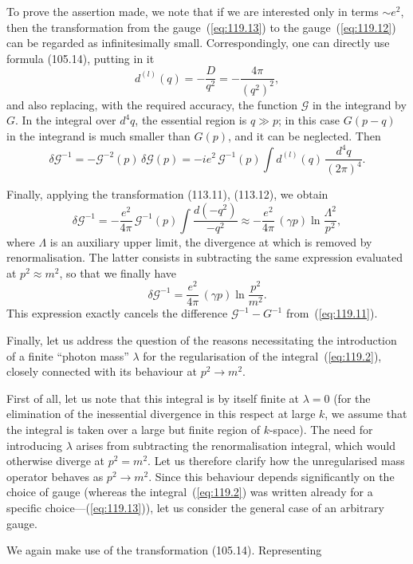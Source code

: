 
To prove the assertion made, we note that if we are interested only in terms $\sim e^2$, then the transformation from the gauge~(\ref{eq:119.13}) to the gauge~(\ref{eq:119.12}) can be regarded as infinitesimally small. Correspondingly, one can directly use formula (105.14), putting in it
\[
d^{(l)}(q) = -\frac{D}{q^2} = -\frac{4\pi}{(q^2)^2},
\]
and also replacing, with the required accuracy, the function $\mathcal{G}$ in the integrand by $G$. In the integral over $d^4q$, the essential region is $q \gg p$; in this case $G(p-q)$ in the integrand is much smaller than $G(p)$, and it can be neglected. Then
\[
\delta\mathcal{G}^{-1} = -\mathcal{G}^{-2}(p)\,\delta\mathcal{G}(p) = -ie^2\,\mathcal{G}^{-1}(p) \int d^{(l)}(q)\,\frac{d^4q}{(2\pi)^4}.
\]

Finally, applying the transformation (113.11), (113.12), we obtain
\[
\delta\mathcal{G}^{-1} = -\frac{e^2}{4\pi}\,\mathcal{G}^{-1}(p) \int \frac{d(-q^2)}{-q^2} \approx -\frac{e^2}{4\pi}\,(\gamma p)\ln\frac{\Lambda^2}{p^2},
\]
where $\Lambda$ is an auxiliary upper limit, the divergence at which is removed by renormalisation. The latter consists in subtracting the same expression evaluated at $p^2 \approx m^2$, so that we finally have
\[
\delta\mathcal{G}^{-1} = \frac{e^2}{4\pi}\,(\gamma p)\ln\frac{p^2}{m^2}.
\]
This expression exactly cancels the difference $\mathcal{G}^{-1} - G^{-1}$ from~(\ref{eq:119.11}).

Finally, let us address the question of the reasons necessitating the introduction of a finite ``photon mass'' $\lambda$ for the regularisation of the integral~(\ref{eq:119.2}), closely connected with its behaviour at $p^2 \to m^2$.

First of all, let us note that this integral is by itself finite at $\lambda = 0$ (for the elimination of the inessential divergence in this respect at large $k$, we assume that the integral is taken over a large but finite region of $k$-space). The need for introducing $\lambda$ arises from subtracting the renormalisation integral, which would otherwise diverge at $p^2 = m^2$. Let us therefore clarify how the unregularised mass operator behaves as $p^2 \to m^2$. Since this behaviour depends significantly on the choice of gauge (whereas the integral~(\ref{eq:119.2}) was written already for a specific choice---(\ref{eq:119.13})), let us consider the general case of an arbitrary gauge.

We again make use of the transformation (105.14). Representing

